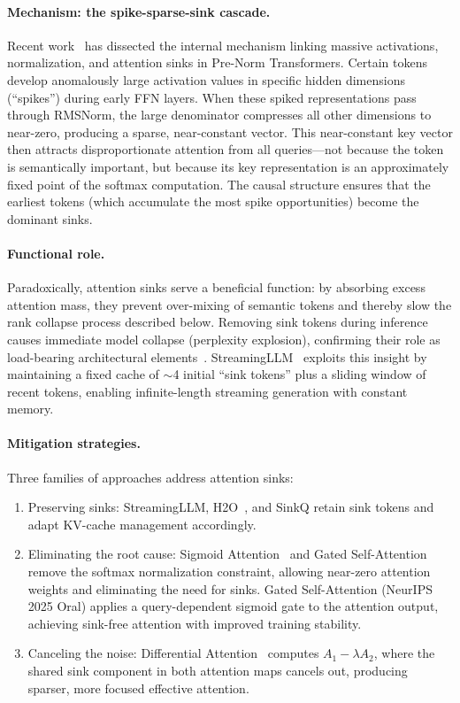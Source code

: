 \paragraph{Mechanism: the spike-sparse-sink cascade.}
Recent work~\cite{sun2026spike} has dissected the internal mechanism linking massive activations, normalization, and attention sinks in Pre-Norm Transformers. Certain tokens develop anomalously large activation values in specific hidden dimensions (``spikes'') during early FFN layers. When these spiked representations pass through RMSNorm, the large denominator compresses all other dimensions to near-zero, producing a sparse, near-constant vector. This near-constant key vector then attracts disproportionate attention from all queries---not because the token is semantically important, but because its key representation is an approximately fixed point of the softmax computation. The causal structure ensures that the earliest tokens (which accumulate the most spike opportunities) become the dominant sinks.

\paragraph{Functional role.}
Paradoxically, attention sinks serve a beneficial function: by absorbing excess attention mass, they prevent over-mixing of semantic tokens and thereby slow the rank collapse process described below. Removing sink tokens during inference causes immediate model collapse (perplexity explosion), confirming their role as load-bearing architectural elements~\cite{xiao2023streamingllm}. StreamingLLM~\cite{xiao2023streamingllm} exploits this insight by maintaining a fixed cache of $\sim$4 initial ``sink tokens'' plus a sliding window of recent tokens, enabling infinite-length streaming generation with constant memory.

\paragraph{Mitigation strategies.}
Three families of approaches address attention sinks:
\begin{enumerate}[nosep]
\item Preserving sinks: StreamingLLM, H2O~\cite{zhang2023h2o}, and SinkQ retain sink tokens and adapt KV-cache management accordingly.
\item Eliminating the root cause: Sigmoid Attention~\cite{ramapuram2024sigmoid} and Gated Self-Attention~\cite{qiu2025gated} remove the softmax normalization constraint, allowing near-zero attention weights and eliminating the need for sinks. Gated Self-Attention (NeurIPS 2025 Oral) applies a query-dependent sigmoid gate to the attention output, achieving sink-free attention with improved training stability.
\item Canceling the noise: Differential Attention~\cite{ye2024differential} computes $A_1 - \lambda A_2$, where the shared sink component in both attention maps cancels out, producing sparser, more focused effective attention.
\end{enumerate}

